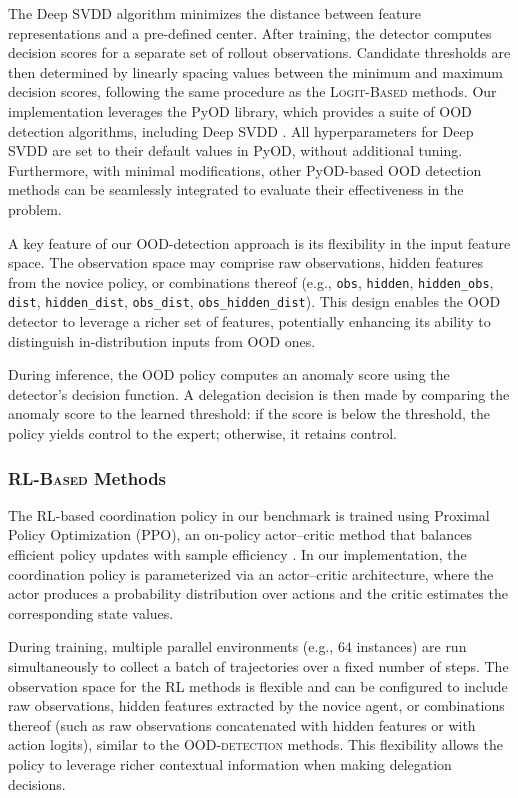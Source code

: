 The Deep SVDD algorithm minimizes the distance between feature representations and a pre-defined center. After training, the detector computes decision scores for a separate set of rollout observations. Candidate thresholds are then determined by linearly spacing values between the minimum and maximum decision scores, following the same procedure as the \textsc{Logit-Based} methods. Our implementation leverages the PyOD library, which provides a suite of OOD detection algorithms, including Deep SVDD \citep{zhao2019pyod}. All hyperparameters for Deep SVDD are set to their default values in PyOD, without additional tuning. Furthermore, with minimal modifications, other PyOD-based OOD detection methods can be seamlessly integrated to evaluate their effectiveness in the \ourMethod problem.

A key feature of our OOD-detection approach is its flexibility in the input feature space. The observation space may comprise raw observations, hidden features from the novice policy, or combinations thereof (e.g., \texttt{obs}, \texttt{hidden}, \texttt{hidden\_obs}, \texttt{dist}, \texttt{hidden\_dist}, \texttt{obs\_dist}, \texttt{obs\_hidden\_dist}). This design enables the OOD detector to leverage a richer set of features, potentially enhancing its ability to distinguish in-distribution inputs from OOD ones.

During inference, the OOD policy computes an anomaly score using the detector's decision function. A delegation decision is then made by comparing the anomaly score to the learned threshold: if the score is below the threshold, the policy yields control to the expert; otherwise, it retains control. 




\subsubsection{\textsc{RL-Based} Methods}
The RL-based coordination policy in our benchmark is trained using Proximal Policy Optimization (PPO), an on-policy actor–critic method that balances efficient policy updates with sample efficiency \citep{schulman2017proximal}. In our implementation, the coordination policy is parameterized via an actor–critic architecture, where the actor produces a probability distribution over actions and the critic estimates the corresponding state values.

During training, multiple parallel environments (e.g., $64$ instances) are run simultaneously to collect a batch of trajectories over a fixed number of steps. The observation space for the RL methods is flexible and can be configured to include raw observations, hidden features extracted by the novice agent, or combinations thereof (such as raw observations concatenated with hidden features or with action logits), similar to the \textsc{OOD-detection} methods. This flexibility allows the policy to leverage richer contextual information when making delegation decisions.

